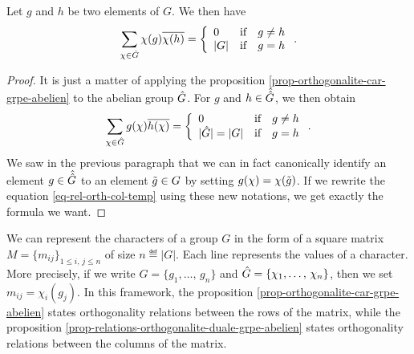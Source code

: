 \begin{prop}
\label{prop-relations-orthogonalite-duale-grpe-abelien}
Let $g$ and $h$ be two elements of $G$. We then have
\begin{equation*}
\sum_{\chi \in \hat{G}}{\chi(g) \overline{\chi(h)}} = \left\{\begin{array}{lll} 0 & \text{if} & g \neq h \\|G| & \text{if} & g = h \end{array} \right..
\end{equation*}

\end{prop}
\begin{proof}
It is just a matter of applying the proposition \ref{prop-orthogonalite-car-grpe-abelien} to the abelian group $\hat{G}$. For $g$ and $ h \in \hat{\hat{G}}$, we then obtain
\begin{equation}
\label{eq-rel-orth-col-temp}
\sum_{\chi \in \hat{G}}{g(\chi) \overline{h(\chi)}} = \left\{\begin{array}{lll} 0 & \text{if} & g \neq h \\|\hat{G}| = |G| & \text{if} & g = h \end{array} \right. .
\end{equation}
We saw in the previous paragraph that we can in fact canonically identify an element $ g \in \hat{\hat{G}}$ to an element $\tilde{g} \in G$ by setting $g(\chi) = \chi(\tilde{g})$. If we rewrite the equation \eqref{eq-rel-orth-col-temp} using these new notations, we get exactly the formula we want.
\end{proof}


\begin{rem}
We can represent the characters of a group $G$ in the form of a square matrix $ M = \{m_{ij}\}_{1 \leq i, \, j \leq n}$ of size $n \eqdef |G|$. Each line represents the values of a character. More precisely, if we write $ G = \{g_1, \ldots, \, g_n\}$ and $\hat{G} = \{\chi_1, \ldots, \, \chi_n\}$, then we set $ m_{ij} = \chi_i (g_j)$. In this framework, the proposition \ref{prop-orthogonalite-car-grpe-abelien} states orthogonality relations between the rows of the matrix, while the proposition \ref{prop-relations-orthogonalite-duale-grpe-abelien} states orthogonality relations between the columns of the matrix.
\end{rem}

